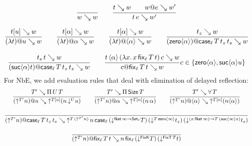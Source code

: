 \documentclass[acmlarge,review,anonymous]{acmart}\settopmatter{printfolios=true}
\begin{document}
\vspace{-4ex}
\begin{gather*}
  \ru{}{w \evalsto w}
\qquad
  \ru{t \evalsto w \qquad w @ e \evalsto w'}{t\,e \evalsto w'}
\end{gather*}


\begin{gather*}
  \ru{t[u] \evalsto w
    }{(\lambda t) @ u \evalsto w}
\qquad
  \ru{t[\alpha] \evalsto w
    }{(\lambda t) @ \alpha \evalsto w}
\qquad
  \ru{t[\alpha] \evalsto w
    }{(\lambda t) @ \ann \alpha \evalsto w}
\qquad
  \ru{t_z \evalsto w
    }{(\zero \alpha) @ \casett \evalsto w}
\\[2ex]
  \ru{t_s\, t \evalsto w
    }{(\suc \alpha t) @ \casett \evalsto w}
\qquad
  \ru{t\,\ann \alpha\,(\lambda x.\, x\, \fixtt)\,c \evalsto w
     }{c @ \fixtt \evalsto w
     }{c\in \{ \zero \alpha, \suc \alpha u \}}
\end{gather*}
For NbE, we add evaluation rules that deal with elimination of delayed reflection:
\begin{gather*}
  \ru{T' \evalsto \piT U T
    }{(\up {T'} n) @ u \evalsto \up{T[u]} (n \, \down U u) }
\qquad
  \ru{T' \evalsto \piT \Size T
    }{(\up {T'} n) @ \alpha \evalsto \up{T[\alpha]} (n \, \alpha)}
\qquad
  \ru{T' \evalsto \forallT T
    }{(\up {T'} n) @ \ann \alpha \evalsto \up{T[\alpha]} (n \ann \alpha)}
\\[2ex]
  \ru{%
    }{(\up {T'} n) @ \case[\ell] T {t_z} {t_s} \evalsto
      \up{T\,(\up{T'} n)}\,
         n\,\case[\ell]
             {(\down {\Nat \infty \to \Set[\ell]} T)}
             {(\down {T\,{\zero\infty}} t_z)}
             {(\down {\funS x {\Nat \infty} T\,(\suc \infty x)} t_s)}
    }
\\[2ex]
  \ru{%
    }{(\up {T'} n) @ \fix[\ell] T t \evalsto
      n\,\fix[\ell] {(\down {\FixK} T)} {(\down {\FixT\, T} t)}
    }
\end{gather*}
\end{document}
